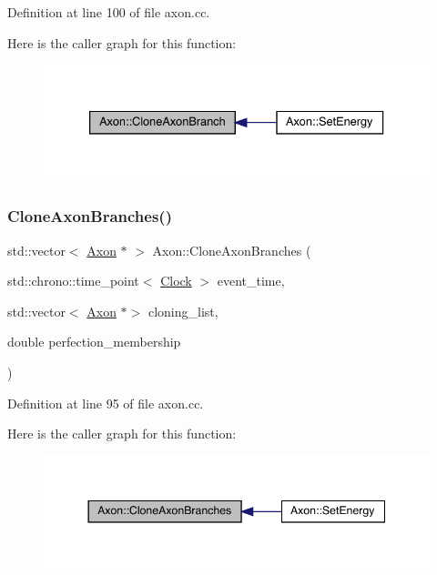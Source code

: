 Definition at line 100 of file axon.\+cc.

Here is the caller graph for this function\+:\nopagebreak
\begin{figure}[H]
\begin{center}
\leavevmode
\includegraphics[width=333pt]{class_axon_a7720ee66a75e87f4e308b82d1841443a_icgraph}
\end{center}
\end{figure}
\mbox{\label{class_axon_af2d6d5bc9ee0cd8ff654a949ef1cc294}} 
\subsubsection{\texorpdfstring{Clone\+Axon\+Branches()}{CloneAxonBranches()}}
{\footnotesize\ttfamily std\+::vector$<$ \hyperlink{class_axon}{Axon} $\ast$ $>$ Axon\+::\+Clone\+Axon\+Branches (\begin{DoxyParamCaption}\item[{std\+::chrono\+::time\+\_\+point$<$ \hyperlink{universe_8h_a0ef8d951d1ca5ab3cfaf7ab4c7a6fd80}{Clock} $>$}]{event\+\_\+time,  }\item[{std\+::vector$<$ \hyperlink{class_axon}{Axon} $\ast$$>$}]{cloning\+\_\+list,  }\item[{double}]{perfection\+\_\+membership }\end{DoxyParamCaption})}



Definition at line 95 of file axon.\+cc.

Here is the caller graph for this function\+:\nopagebreak
\begin{figure}[H]
\begin{center}
\leavevmode
\includegraphics[width=344pt]{class_axon_af2d6d5bc9ee0cd8ff654a949ef1cc294_icgraph}
\end{center}
\end{figure}
\mbox{\label{class_axon_a41e97ead4c793003db2de87061574c26}} 
